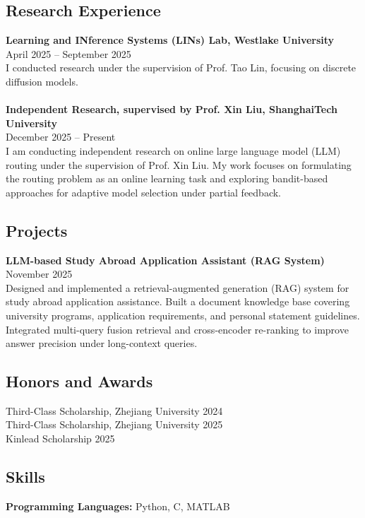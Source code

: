 \documentclass[letterpaper, 12pt]{article}
\begin{document}
\subsection*{\color{OliveGreen} Research Experience}
\textbf{Learning and INference Systems (LINs) Lab, Westlake University }   \\
\hfill April 2025 – September 2025 \\
        I conducted research under the supervision of Prof. Tao Lin, focusing on discrete diffusion models.
\\\\
\textbf{Independent Research, supervised by Prof. Xin Liu, ShanghaiTech University} \\
\hfill December 2025 – Present \\
I am conducting independent research on online large language model (LLM) routing under the supervision of Prof. Xin Liu. My work focuses on formulating the routing problem as an online learning task and exploring bandit-based approaches for adaptive model selection under partial feedback.

\subsection*{\color{OliveGreen} Projects}

\textbf{LLM-based Study Abroad Application Assistant (RAG System)} \\
\hfill November 2025 \\
Designed and implemented a retrieval-augmented generation (RAG) system for study abroad application assistance. Built a document knowledge base covering university programs, application requirements, and personal statement guidelines. Integrated multi-query fusion retrieval and cross-encoder re-ranking to improve answer precision under long-context queries. 



\subsection*{\color{OliveGreen} Honors and Awards}
\begin{flushleft}
     Third-Class Scholarship, Zhejiang University   \hfill 2024 \\
   Third-Class Scholarship, Zhejiang University   \hfill 2025 \\
    Kinlead Scholarship \hfill 2025 \\
\end{flushleft}


\subsection*{\color{OliveGreen} Skills}
\begin{flushleft}
   {\textbf{Programming Languages:}} Python, C, MATLAB
   
\end{flushleft}
\clearpage














\end{document}
